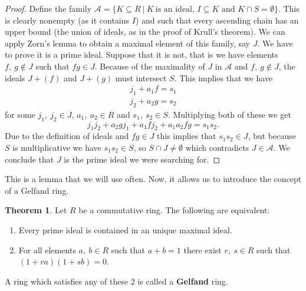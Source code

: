 \documentclass[a4paper]{book}
\theoremstyle{definition}
\newtheorem{theorem}{Theorem}[section]
\theoremstyle{ejemplo}
\theoremstyle{demostracion}
\begin{document}
\begin{proof}
	Define the family $\mathcal{A} = \{ K \subseteq R\ |\ K\ \text{is an ideal, } I \subseteq K \text{ and } K \cap S = \emptyset\}$. This is clearly nonempty (as it contains $I$) and such that every ascending chain has an upper bound (the union of ideals, as in the proof of Krull's theorem). We can apply Zorn's lemma to obtain a maximal element of this family, say $J$. We have to prove it is a prime ideal. Suppose that it is not, that is we have elements $f,\ g \not \in J$ such that $fg \in J$. Because of the maximality of $J$ in $\mathcal{A}$ and $f,\ g \not \in J$, the ideals $J + (f)$ and $J + (g)$ must intersect $S$. This implies that we have
	\begin{equation*}
		\begin{array}{c}
			j_1 + a_1 f = s_1 \\
			j_2 + a_2 g = s_2
		\end{array}
	\end{equation*}
	for some $j_1,\ j_2 \in J$, $a_1,\ a_2 \in R$ and $s_1,\ s_2 \in S$. Multiplying both of these we get
	\begin{equation*}
		j_1 j_2 + a_2 g j_1 + a_1 f j_2 + a_1 a_2 f g = s_1 s_2.
	\end{equation*}
	Due to the definition of ideals and $fg \in J$ this implies that $s_1 s_2 \in J$, but because $S$ is multiplicative we have $s_1 s_2 \in S$, so $S \cap J \neq \emptyset$ which contradicts $J \in \mathcal{A}$. We conclude that $J$ is the prime ideal we were searching for.
\end{proof}

This is a lemma that we will use often. Now, it allows us to introduce the concept of a Gelfand ring.

\begin{theorem}\label{thm:gelfand_def}
	Let $R$ be a commutative ring. The following are equivalent:
	\begin{enumerate}
		\item
		Every prime ideal is contained in an unique maximal ideal.
		\item
		For all elements $a,\ b \in R$ such that $a + b = 1$ there exist $r,\ s \in R$ such that $(1+ra)(1+sb) = 0$.
	\end{enumerate}
	A ring which satisfies any of these 2 is called a \textbf{Gelfand} ring.
\end{theorem}
\end{document}
